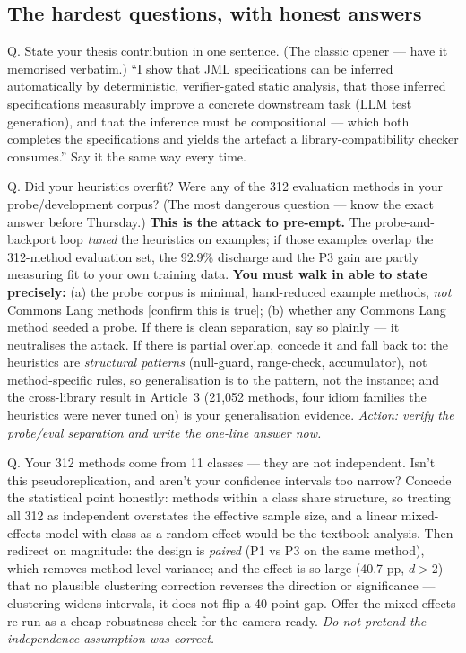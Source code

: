 \documentclass[11pt]{article}
\begin{document}
\subsection{The hardest questions, with honest answers}

\begin{qbox}{Q. State your thesis contribution in one sentence. (The classic opener --- have it memorised verbatim.)}
``I show that JML specifications can be inferred automatically by deterministic,
verifier-gated static analysis, that those inferred specifications measurably
improve a concrete downstream task (LLM test generation), and that the
inference must be compositional --- which both completes the specifications and
yields the artefact a library-compatibility checker consumes.'' Say it the same
way every time.
\end{qbox}

\begin{qbox}{Q. Did your heuristics overfit? Were any of the 312 evaluation methods in your probe/development corpus? (The most dangerous question --- know the exact answer before Thursday.)}
\textbf{This is the attack to pre-empt.} The probe-and-backport loop \emph{tuned}
the heuristics on examples; if those examples overlap the 312-method evaluation
set, the 92.9\% discharge and the P3 gain are partly measuring fit to your own
training data. \textbf{You must walk in able to state precisely:} (a) the probe
corpus is minimal, hand-reduced example methods, \emph{not} Commons Lang
methods [confirm this is true]; (b) whether any Commons Lang method seeded a
probe. If there is clean separation, say so plainly --- it neutralises the
attack. If there is partial overlap, concede it and fall back to: the
heuristics are \emph{structural patterns} (null-guard, range-check,
accumulator), not method-specific rules, so generalisation is to the pattern,
not the instance; and the cross-library result in Article~3 (21{,}052 methods,
four idiom families the heuristics were never tuned on) is your
generalisation evidence. \emph{Action: verify the probe/eval separation and
write the one-line answer now.}
\end{qbox}

\begin{qbox}{Q. Your 312 methods come from 11 classes --- they are not independent. Isn't this pseudoreplication, and aren't your confidence intervals too narrow?}
Concede the statistical point honestly: methods within a class share structure,
so treating all 312 as independent overstates the effective sample size, and a
linear mixed-effects model with class as a random effect would be the textbook
analysis. Then redirect on magnitude: the design is \emph{paired} (P1 vs P3 on
the same method), which removes method-level variance; and the effect is so
large (40.7 pp, $d>2$) that no plausible clustering correction reverses the
direction or significance --- clustering widens intervals, it does not flip a
40-point gap. Offer the mixed-effects re-run as a cheap robustness check for
the camera-ready. \emph{Do not pretend the independence assumption was
correct.}
\end{qbox}
\end{document}
